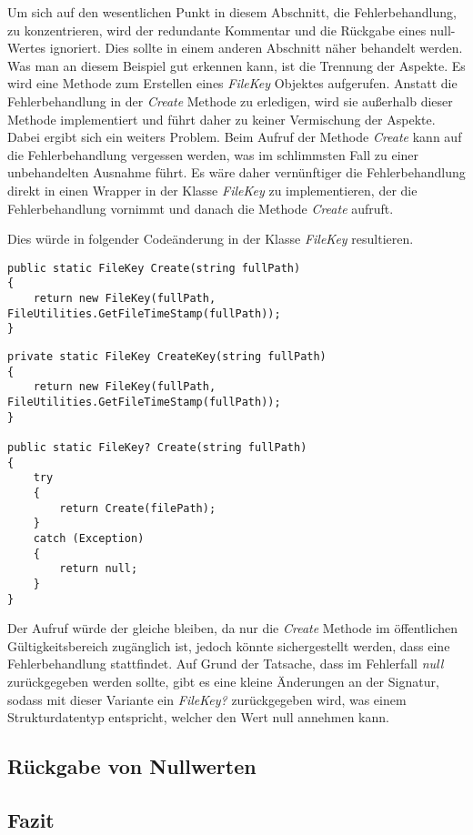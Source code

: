 Um sich auf den wesentlichen Punkt in diesem Abschnitt, die Fehlerbehandlung, zu konzentrieren, wird der redundante Kommentar und die Rückgabe eines null-Wertes ignoriert. Dies sollte in einem anderen Abschnitt näher behandelt werden. %
Was man an diesem Beispiel gut erkennen kann, ist die Trennung der Aspekte. Es wird eine Methode zum Erstellen eines \textit{FileKey} Objektes aufgerufen. Anstatt die Fehlerbehandlung in der \textit{Create} Methode zu erledigen, wird sie außerhalb dieser Methode implementiert und führt daher zu keiner Vermischung der Aspekte. Dabei ergibt sich ein weiters Problem. Beim Aufruf der Methode \textit{Create} kann auf die Fehlerbehandlung vergessen werden, was im schlimmsten Fall zu einer unbehandelten Ausnahme führt. Es wäre daher vernünftiger die Fehlerbehandlung direkt in einen Wrapper in der Klasse \textit{FileKey} zu implementieren, der die Fehlerbehandlung vornimmt und danach die Methode \textit{Create} aufruft.

Dies würde in folgender Codeänderung in der Klasse \textit{FileKey} resultieren.

\begin{lstlisting}[language={[Sharp]C}, caption=Fehlerbehandlung in der Klasse FileKey vorher, label=lst:AspectedErrorhandling]
public static FileKey Create(string fullPath)
{
	return new FileKey(fullPath, FileUtilities.GetFileTimeStamp(fullPath));
}
\end{lstlisting}

\begin{lstlisting}[language={[Sharp]C}, caption=Fehlerbehandlung in der Klasse FileKey nachher, label=lst:AspectedErrorhandling]
private static FileKey CreateKey(string fullPath)
{
	return new FileKey(fullPath, FileUtilities.GetFileTimeStamp(fullPath));
}
				
public static FileKey? Create(string fullPath)
{
	try
	{
		return Create(filePath);
	}
	catch (Exception)
	{
		return null;
	}
}
\end{lstlisting}

Der Aufruf würde der gleiche bleiben, da nur die \textit{Create} Methode im öffentlichen Gültigkeitsbereich zugänglich ist, jedoch könnte sichergestellt werden, dass eine Fehlerbehandlung stattfindet. Auf Grund der Tatsache, dass im Fehlerfall \textit{null} zurückgegeben werden sollte, gibt es eine kleine Änderungen an der Signatur, sodass mit dieser Variante ein \textit{FileKey?} zurückgegeben wird, was einem Strukturdatentyp entspricht, welcher den Wert null annehmen kann. 

\subsection{Rückgabe von Nullwerten}


\subsection{Fazit}
